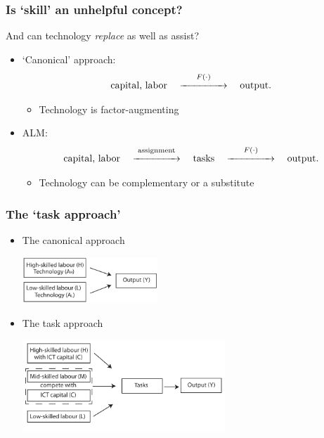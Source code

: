 \documentclass[red]{beamer}
\newcommand{\vitem}{\vfill\item}
\begin{document}
\begin{frame}[c]
\frametitle{Is `skill' an unhelpful concept?}
And can technology {\em replace} as well as assist?
\vfill
\begin{itemize}
\item `Canonical' approach:
\[ \text{capital, labor} \quad \overset{F(\cdot)}{\xrightarrow{\hspace*{1.5cm}}} \quad \text{output}. \]
\begin{itemize}
\item Technology is factor-augmenting
\vfill
\end{itemize}
\pause
\vitem ALM:
\[ \text{capital, labor} \quad \overset{\text{assignment}}{\xrightarrow{\hspace*{1.5cm}}} \quad \text{tasks} \quad \overset{F(\cdot)}{\xrightarrow{\hspace*{1.5cm}}} \quad \text{output}. \]
\begin{itemize}
\item Technology can be complementary or a substitute
\end{itemize}
\end{itemize}
\end{frame}


\begin{frame}[c]
\frametitle{The `task approach'}
\begin{itemize}
\item The canonical approach\\
\begin{center}
\includegraphics[width=2in]{slides_fig/CES.pdf}
\end{center}
\item The task approach\\
\begin{center}
\includegraphics[width=3in]{slides_fig/CES_tasks.pdf}
\end{center}
\end{itemize}
\end{frame}
\end{document}
